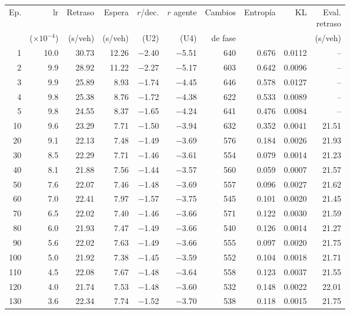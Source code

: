 \begin{table}[H]
\centering
\scriptsize
\setlength{\tabcolsep}{3pt}
\setlength{\tabcolsep}{2pt}
\begin{tabular}{rrrrrrrrrr}
\toprule
Ep. & lr & Retraso & Espera & $r$/dec. & $r$ agente & Cambios & Entropía & KL & \makecell{Eval.\\retraso} \\
 & ($\times 10^{-4}$) & (s/veh) & (s/veh) & (U2) & (U4) & de fase &  &  & (s/veh) \\
\midrule
1 & 10.0 & 30.73 & 12.26 & $-$2.40 & $-$5.51 & 640 & 0.676 & 0.0112 & -- \\
2 & 9.9 & 28.92 & 11.22 & $-$2.27 & $-$5.17 & 603 & 0.642 & 0.0096 & -- \\
3 & 9.9 & 25.89 & 8.93 & $-$1.74 & $-$4.45 & 646 & 0.578 & 0.0127 & -- \\
4 & 9.8 & 25.38 & 8.76 & $-$1.72 & $-$4.38 & 622 & 0.533 & 0.0089 & -- \\
5 & 9.8 & 24.55 & 8.37 & $-$1.65 & $-$4.24 & 641 & 0.476 & 0.0084 & -- \\
10 & 9.6 & 23.29 & 7.71 & $-$1.50 & $-$3.94 & 632 & 0.352 & 0.0041 & 21.51 \\
20 & 9.1 & 22.13 & 7.48 & $-$1.49 & $-$3.69 & 576 & 0.184 & 0.0026 & 21.93 \\
30 & 8.5 & 22.29 & 7.71 & $-$1.46 & $-$3.61 & 554 & 0.079 & 0.0014 & 21.23 \\
40 & 8.1 & 21.88 & 7.56 & $-$1.44 & $-$3.57 & 560 & 0.059 & 0.0007 & 21.57 \\
50 & 7.6 & 22.07 & 7.46 & $-$1.48 & $-$3.69 & 557 & 0.096 & 0.0027 & 21.62 \\
60 & 7.0 & 22.41 & 7.97 & $-$1.57 & $-$3.75 & 545 & 0.101 & 0.0020 & 21.45 \\
70 & 6.5 & 22.02 & 7.40 & $-$1.46 & $-$3.66 & 571 & 0.122 & 0.0030 & 21.59 \\
80 & 6.0 & 21.93 & 7.47 & $-$1.49 & $-$3.66 & 540 & 0.126 & 0.0014 & 21.27 \\
90 & 5.6 & 22.02 & 7.63 & $-$1.49 & $-$3.66 & 555 & 0.097 & 0.0020 & 21.75 \\
100 & 5.0 & 21.92 & 7.38 & $-$1.45 & $-$3.59 & 552 & 0.104 & 0.0018 & 21.71 \\
110 & 4.5 & 22.08 & 7.67 & $-$1.48 & $-$3.64 & 558 & 0.123 & 0.0037 & 21.55 \\
120 & 4.0 & 21.74 & 7.53 & $-$1.48 & $-$3.60 & 532 & 0.148 & 0.0022 & 22.01 \\
130 & 3.6 & 22.34 & 7.74 & $-$1.52 & $-$3.70 & 538 & 0.118 & 0.0015 & 21.75 \\

\end{tabular}
\end{table}
